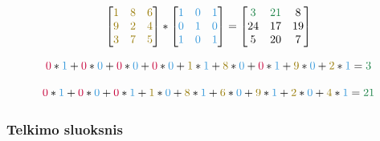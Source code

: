 \documentclass{VUMIFPSbakalaurinis}
\begin{document}
\begin{equation}\label{eq:convl}
\begin{bmatrix}
\textcolor{myyellow}{1} & \textcolor{myyellow}{8} & \textcolor{myyellow}{6} \\
\textcolor{myyellow}{9} & \textcolor{myyellow}{2} & \textcolor{myyellow}{4} \\
\textcolor{myyellow}{3} & \textcolor{myyellow}{7} & \textcolor{myyellow}{5}
\end{bmatrix}
*
\begin{bmatrix}
\textcolor{myblue}{1} & \textcolor{myblue}{0} & \textcolor{myblue}{1} \\
\textcolor{myblue}{0} & \textcolor{myblue}{1} & \textcolor{myblue}{0} \\
\textcolor{myblue}{1} & \textcolor{myblue}{0} & \textcolor{myblue}{1}
\end{bmatrix}
=
\begin{bmatrix}
\textcolor{mygreen}{3} & \textcolor{mygreen}{21} & 8 \\
24 & 17 & 19 \\
5 & 20 & 7
\end{bmatrix}
\end{equation}

\begin{equation}\label{eq:convl1}
\textcolor{myred}{0}*\textcolor{myblue}{1}+\textcolor{myred}{0}*\textcolor{myblue}{0}+\textcolor{myred}{0}*\textcolor{myblue}{0}+\textcolor{myred}{0}*\textcolor{myblue}{0}+\textcolor{myyellow}{1}*\textcolor{myblue}{1}+\textcolor{myyellow}{8}*\textcolor{myblue}{0}+\textcolor{myred}{0}*\textcolor{myblue}{1}+\textcolor{myyellow}{9}*\textcolor{myblue}{0}+\textcolor{myyellow}{2}*\textcolor{myblue}{1}=\textcolor{mygreen}{3}
\end{equation}


\begin{equation}\label{eq:convl2}
\textcolor{myred}{0}*\textcolor{myblue}{1}+\textcolor{myred}{0}*\textcolor{myblue}{0}+\textcolor{myred}{0}*\textcolor{myblue}{1}+\textcolor{myyellow}{1}*\textcolor{myblue}{0}+\textcolor{myyellow}{8}*\textcolor{myblue}{1}+\textcolor{myyellow}{6}*\textcolor{myblue}{0}+\textcolor{myyellow}{9}*\textcolor{myblue}{1}+\textcolor{myyellow}{2}*\textcolor{myblue}{0}+\textcolor{myyellow}{4}*\textcolor{myblue}{1}=\textcolor{mygreen}{21}
\end{equation}

\subsubsection{Telkimo sluoksnis}
\end{document}
